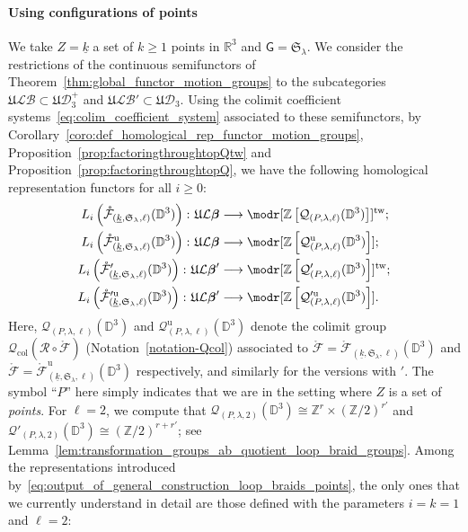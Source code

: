 \documentclass[AHL,Unicode,published]{cedram}
\newcommand{\Int}{\mathring}
\newcommand{\tw}{\mathrm{tw}}
\newcommand{\col}{\mathrm{col}}
\newcommand{\unt}{\mathrm{u}}
\newcommand{\Sym}{\mathfrak{S}}
\newcommand{\fU}{\ensuremath{\mathfrak{U}}}
\newcommand{\sR}{\mathscr{R}}
\newcommand{\sG}{\mathsf{G}}
\newcommand{\cB}{\mathcal{B}}
\newcommand{\cD}{\mathcal{D}}
\newcommand{\cF}{\mathcal{F}}
\newcommand{\cL}{\mathcal{L}}
\newcommand{\cQ}{\mathcal{Q}}
\newcommand{\bD}{\mathbb{D}}
\newcommand{\bR}{\mathbb{R}}
\newcommand{\bZ}{\mathbb{Z}}
\newcommand{\too}{\ensuremath{\longrightarrow}}
\newcommand{\Beta}{\boldsymbol{\beta}}
\renewcommand{\geq}{\geqslant}
\begin{document}
\paragraph*{Using configurations of points}
We take $Z=\underline{k}$ a set of $k\geq 1$ points in $\bR^{3}$ and $\sG=\Sym_{\lambda}$. We consider the restrictions of the continuous semifunctors of Theorem~\ref{thm:global_functor_motion_groups} to the subcategories $\fU\cL\cB\subset \fU\cD^{+}_{3}$ and $\fU\cL\cB'\subset \fU\cD_{3}$. Using the colimit coefficient systems~\eqref{eq:colim_coefficient_system} associated to these semifunctors, by Corollary~\ref{coro:def_homological_rep_functor_motion_groups}, Proposition~\ref{prop:factoringthroughtopQtw} and Proposition~\ref{prop:factoringthroughtopQ}, we have the following homological representation functors for all $i\geq 0$:
\begingroup
\allowdisplaybreaks
\begin{align}\label{eq:output_of_general_construction_loop_braids_points}
L_{i}\left(\Int{\cF}_{\left(\underline{k},\Sym_{\lambda},\ell\right)}(\bD^{3})\right)\colon\fU\cL\Beta &\too \modr[\bZ\left[\cQ_{(P,\lambda,\ell)}(\bD^{3})\right]]^{\tw}; \\
L_{i}\left(\Int{\cF}^{\unt}_{\left(\underline{k},\Sym_{\lambda},\ell\right)}(\bD^{3})\right)\colon\fU\cL\Beta &\too \modr[\bZ\left[\cQ^{\unt}_{(P,\lambda,\ell)}(\bD^{3})\right]];\nonumber \\
L_{i}\left(\Int{\cF}'_{\left(\underline{k},\Sym_{\lambda},\ell\right)}(\bD^{3})\right)\colon\fU\cL\Beta' &\too \modr[\bZ\left[\cQ'_{(P,\lambda,\ell)}(\bD^{3})\right]]^{\tw}; \nonumber\\
L_{i}\left(\Int{\cF}'^{\unt}_{\left(\underline{k},\Sym_{\lambda},\ell\right)}(\bD^{3})\right)\colon\fU\cL\Beta' &\too \modr[\bZ\left[\cQ'^{\unt}_{(P,\lambda,\ell)}(\bD^{3})\right]].\nonumber
\end{align}
\endgroup
Here, $\cQ_{(P,\lambda,\ell)}(\bD^{3})$ and $\cQ^{\unt}_{(P,\lambda,\ell)}(\bD^{3})$ denote the colimit group $\cQ_{\col}(\sR \circ \Int{\cF})$ (Notation~\ref{notation-Qcol}) associated to $\Int{\cF} = \Int{\cF}_{(\underline{k},\Sym_{\lambda},\ell)}(\bD^{3})$ and $\Int{\cF} = \Int{\cF}^{\unt}_{(\underline{k},\Sym_{\lambda},\ell)}(\bD^{3})$ respectively, and similarly for the versions with $'$. The symbol ``$P$'' here simply indicates that we are in the setting where $Z$ is a set of \emph{points}. For $\ell = 2$, we compute that $\cQ_{(P,\lambda,2)}(\bD^{3})\cong \bZ^{r}\times (\bZ/2)^{r'}$ and $\cQ'_{(P,\lambda,2)}(\bD^{3})\cong (\bZ/2)^{r+r'}$; see Lemma~\ref{lem:transformation_groups_ab_quotient_loop_braid_groups}. Among the representations introduced by~\eqref{eq:output_of_general_construction_loop_braids_points}, the only ones that we currently understand in detail are those defined with the parameters $i=k=1$ and $\ell = 2$:
\end{document}
